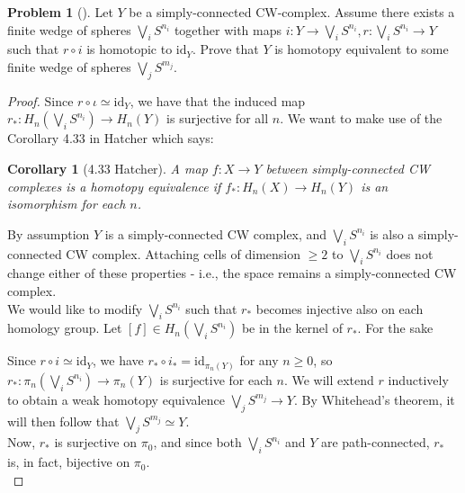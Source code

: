\documentclass[reqno]{amsart}
\newtheorem{corollary}[theorem]{Corollary}
\theoremstyle{definition}
\newtheorem{problem}[theorem]{Problem}
\theoremstyle{remark}
\newcommand{\id}{{\mathrm{id}}}
\begin{document}
    \begin{problem}[]
        Let $Y$ be a simply-connected CW-complex. Assume
        there exists a finite wedge of spheres
        $\bigvee_{i} S^{n_i}$ together with maps
        $i \colon Y \to \bigvee_{i} S^{n_i},
        r\colon \bigvee_{i} S^{n_i} \to Y$ such that
        $r \circ i$ is homotopic to $\id_Y$.
        Prove that $Y$ is homotopy equivalent to some
        finite wedge of spheres 
        $\bigvee_{j} S^{m_j}$.
    \end{problem}

    \begin{proof}
        Since $r \circ \iota \simeq \id_Y$, we
        have that the induced map
        $r_* \colon H_n \left( \bigvee_i S^{n_i} \right) 
        \to H_n (Y)$ is surjective for all $n$. We want
        to make use of the Corollary 4.33 in Hatcher which says:
        \begin{corollary}[4.33 Hatcher]
            A map $f \colon X \to Y$ between simply-connected
            CW complexes is a homotopy equivalence if 
            $f_* \colon H_n (X) \to H_n(Y)$ is an isomorphism
            for each $n$.
        \end{corollary}
        By assumption $Y$ is a simply-connected CW complex,
        and $\bigvee_{i} S^{n_i}$ is also a simply-connected
        CW complex. Attaching cells of
        dimension $\ge 2$ to $\bigvee_{i}S^{n_i}$ 
        does not change either of these properties - i.e., the
        space remains a simply-connected CW complex.\\
        We would like to
        modify $\bigvee_i S^{n_i}$ such that
        $r_*$ becomes injective also on each
        homology group.
        Let $\left[ f \right] 
        \in H_n \left( \bigvee_i S^{n_i} \right) $ 
        be in the kernel of $r_*$.
        For the sake 

        


        \newpage
        Since $r \circ i \simeq \id_Y$, we have
        $r_* \circ i_* = \id_{\pi_n (Y)}$ for any $n \ge 0$, so
        $r_* \colon \pi_n \left( \bigvee_i S^{n_i} \right) 
        \to \pi_n (Y)$ is surjective for each $n$.
        We will extend $r$ inductively to obtain
        a weak homotopy equivalence
        $\bigvee_j S^{m_j} \to Y$. By Whitehead's theorem, it
        will then follow that
        $\bigvee_j S^{m_j} \simeq Y$.\\
        Now, $r_*$ is surjective on
        $\pi_0$, and since both
        $\bigvee_i S^{n_i}$ and $Y$ are path-connected,
        $r_*$ is, in fact, bijective on $\pi_0$.\\
        

\end{proof}
\end{document}
